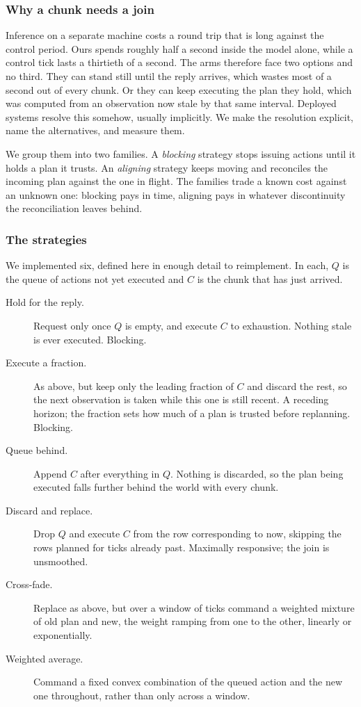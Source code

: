 \subsubsection{Why a chunk needs a join}
\label{sec:chunking-why}

Inference on a separate machine costs a round trip that is long against the
control period. Ours spends roughly half a second inside the model alone, while
a control tick lasts a thirtieth of a second. The arms therefore face two
options and no third. They can stand still until the reply arrives, which
wastes most of a second out of every chunk. Or they can keep executing the plan
they hold, which was computed from an observation now stale by that same
interval. Deployed systems resolve this somehow, usually implicitly. We make
the resolution explicit, name the alternatives, and measure them.

We group them into two families. A \emph{blocking} strategy stops issuing
actions until it holds a plan it trusts. An \emph{aligning} strategy keeps
moving and reconciles the incoming plan against the one in flight. The families
trade a known cost against an unknown one: blocking pays in time, aligning pays
in whatever discontinuity the reconciliation leaves behind.

\subsubsection{The strategies}
\label{sec:chunking-methods}

We implemented six, defined here in enough detail to reimplement. In each, $Q$
is the queue of actions not yet executed and $C$ is the chunk that has just
arrived.

\begin{description}
  \item[Hold for the reply.] Request only once $Q$ is empty, and execute $C$ to
    exhaustion. Nothing stale is ever executed. Blocking.
  \item[Execute a fraction.] As above, but keep only the leading fraction of
    $C$ and discard the rest, so the next observation is taken while this one
    is still recent. A receding horizon; the fraction sets how much of a plan
    is trusted before replanning. Blocking.
  \item[Queue behind.] Append $C$ after everything in $Q$. Nothing is
    discarded, so the plan being executed falls further behind the world with
    every chunk.
  \item[Discard and replace.] Drop $Q$ and execute $C$ from the row
    corresponding to now, skipping the rows planned for ticks already past.
    Maximally responsive; the join is unsmoothed.
  \item[Cross-fade.] Replace as above, but over a window of ticks command a
    weighted mixture of old plan and new, the weight ramping from one to the
    other, linearly or exponentially.
  \item[Weighted average.] Command a fixed convex combination of the queued
    action and the new one throughout, rather than only across a window.
\end{description}

